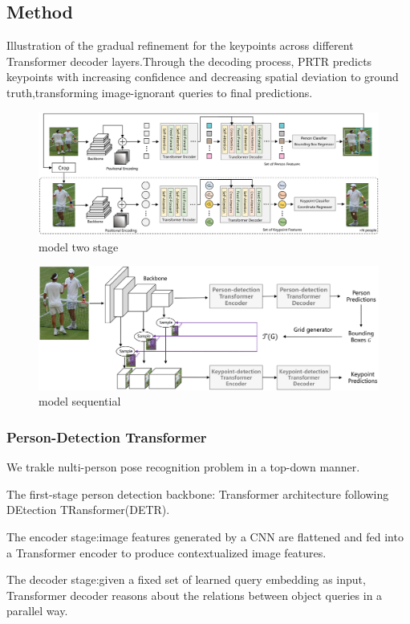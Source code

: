 \documentclass[11pt]{article}
\begin{document}
\subsection{Method}

Illustration of the gradual refinement for the keypoints across different Transformer decoder layers.Through the decoding process, PRTR predicts keypoints with increasing confidence and decreasing spatial deviation to ground truth,transforming image-ignorant queries to final predictions.
\begin{figure}[H]
	\centering
	\includegraphics[scale = 0.6]{30}
	\caption{model two stage}
\end{figure}
\begin{figure}[H]
	\centering
	\includegraphics[scale = 0.6]{31}
	\caption{model sequential}
\end{figure}
\subsubsection{Person-Detection Transformer}

We trakle nulti-person pose recognition problem in a top-down manner.

The first-stage person detection backbone: Transformer architecture following DEtection TRansformer(DETR).

The encoder stage:image features generated by a CNN are flattened and fed into a Transformer encoder to produce contextualized image features.

The decoder stage:given a fixed set of learned query embedding as input, Transformer decoder reasons about the relations between object queries in a parallel way.
\end{document}
